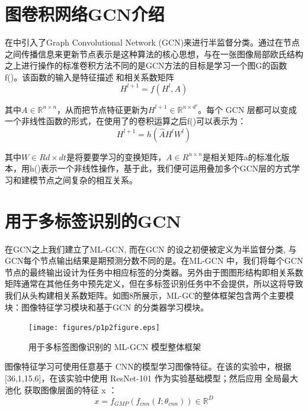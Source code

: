 \section{图卷积网络GCN介绍}
在\cite{Li2014Multi}中引入了Graph Convolutional Network (GCN)来进行半监督分类。通过在节点之间传播信息来更新节点表示是这种算法的核心思想，与在一张图像局部欧氏结构之上进行操作的标准卷积方法不同的是GCN方法的目标是学习一个图G的函数f()。该函数的输入是特征描述  和相关系数矩阵
\begin{equation}
\label{dscNoStgProof0}
H^{l+1} = f(H^l, A)
\end{equation}

其中$A\in \mathbb{R}^{n\times n}$，从而把节点特征更新为$H^{l+1}\in \mathbb{R}^{n\times d'}$。每个 GCN 层都可以变成一个非线性函数的形式，在使用了\cite{Li2014Multi}的卷积运算之后f()可以表示为：
\begin{equation}
\label{dscNoStgProof0}
H^{l+1} = h(\hat{A}H^l W^l)
\end{equation}

其中$W\in Rd\times dt$是将要要学习的变换矩阵，$A\in R^{n\times n}$是相关矩阵a的标准化版本，用h()表示一个非线性操作，基于此，我们便可运用叠加多个GCN层的方式学习和建模节点之间复杂的相互关系。


\section{用于多标签识别的GCN}

在GCN之上我们建立了ML-GCN, 	而在GCN 的设之初便被定义为半监督分类, 与GCN每个节点输出结果是期预测分数不同的是。在ML-GCN 中，我们将每个GCN节点的最终输出设计为任务中相应标签的分类器。另外由于图图形结构即相关系数矩阵通常在其他任务中预先定义，但在多标签识别任务中不会提供，所以这将导致我们从头构建相关系数矩阵。如图8所展示，ML-GC的整体框架包含两个主要模块：图像特征学习模块和基于GCN 的分类器学习模块。

\begin{figure}[htbp!]
	\centering
	\texttt{[image: figures/p1p2figure.eps]}
	\caption{用于多标签图像识别的 ML-GCN 模型整体框架}\label{fig:simuP1P2Result}
	\vspace{-1em}
\end{figure}

图像特征学习可使用任意基于 CNN的模型学习图像特征。在该的实验中，根据[36,1,15,6]，在该实验中使用 ResNet-101 作为实验基础模型；然后应用 全局最大池化 获取图像层面的特征 x ：
\begin{equation}
\label{dscNoStgProof0}
x = f_{GMP}(f_{cnn}(I;\theta_{cnn}))\in \mathbb{R}^D
\end{equation}

